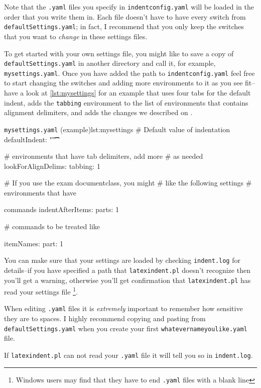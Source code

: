 \documentclass[11pt]{article}
\begin{document}
Note that the \lstinline!.yaml! files you specify in \lstinline!indentconfig.yaml!
will be loaded in the order that you write them in. Each file doesn't have
to have every switch from \lstinline!defaultSettings.yaml!; in fact, I recommend
that you only keep the switches that you want to \emph{change} in these
settings files.

To get started with your own settings file, you might like to save a copy of
\lstinline!defaultSettings.yaml! in another directory and call it, for
example, \lstinline!mysettings.yaml!. Once you have added the path to \lstinline!indentconfig.yaml!
feel free to start changing the switches and adding more environments to it
as you see fit--have a look at \cref{lst:mysettings} for an example
that uses four tabs for the default indent, adds the \lstinline!tabbing!
environment to the list of environments that contains alignment delimiters,
and adds the changes we described on .

\begin{cmhlistings}[style=yaml]{\lstinline!mysettings.yaml! (example)}{lst:mysettings}
# Default value of indentation
defaultIndent: "\t\t\t\t"

# environments that have tab delimiters, add more
# as needed
lookForAlignDelims:
   tabbing: 1

# If you use the exam documentclass, you might 
# like the following settings
# environments that have \item commands
indentAfterItems:
    parts: 1

# commands to be treated like \item
itemNames:
    part: 1
\end{cmhlistings}

You can make sure that your settings are loaded by checking \lstinline!indent.log!
for details--if you have specified a path that \lstinline!latexindent.pl! doesn't
recognize then you'll get a warning, otherwise you'll get confirmation that
\lstinline!latexindent.pl! has read your settings file \footnote{Windows users
	may find that they have to end \lstinline!.yaml! files with a blank line}.

\begin{warning}
	When editing \lstinline!.yaml! files it is \emph{extremely} important
	to remember how sensitive they are to spaces. I highly recommend copying
	and pasting from \lstinline!defaultSettings.yaml! when you create your
	first \lstinline!whatevernameyoulike.yaml! file.

	If \lstinline!latexindent.pl! can not read your \lstinline!.yaml! file it
	will tell you so in \lstinline!indent.log!.
\end{warning}
\end{document}
